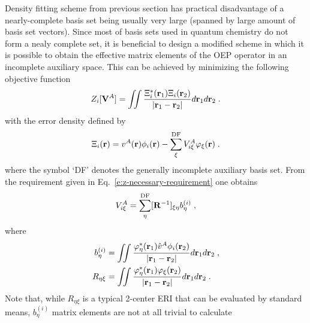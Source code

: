 \documentclass[aip,jcp,amsmath,amssymb,reprint,floatfix]{revtex4-1}
\begin{document}
Density fitting scheme from previous section has practical disadvantage of a nearly\hyp{}complete basis set
being usually very large (spanned by large amount of basis set vectors). 
Since most of basis sets used in quantum chemistry do not form a nealy complete
set, it is beneficial to design a modified scheme in which it is possible to obtain the effective 
matrix elements of the OEP operator in an incomplete auxiliary space. This can be achieved by minimizing 
the following objective function\cite{Cisneros.Andres.Piquemal.Darden.JCP.2005,Piquemal.Cisneros.Reinhardt.Gresh.Darden.JCP.2006}
%
\begin{equation} \label{e:z-incompl}
	Z_i[{\bf V}^A] = \iint 
        \frac{ \Xi_i^*({\bf r}_1) \Xi_i({\bf r}_2) }{\vert {\bf r}_1 - {\bf r}_2 \vert}  
         d{\bf r}_1 d{\bf r}_2  \;.
\end{equation}
%
with the error density defined by
%
\begin{equation} \label{e:error-incompl}
 \Xi_i({\bf r}) = v^A({\bf r}) \phi_i({\bf r}) - \sum_\xi^{\rm DF} V^A_{i\xi} \varphi_\xi({\bf r}) \;.
\end{equation}
%
where the symbol `DF' denotes the generally incomplete auxiliary basis set.
From the requirement given in Eq.~\eqref{e:z-necessary-requirement}
one obtains
%
\begin{equation} \label{e:v-incompl}
  V^A_{i\xi} = \sum_\eta^{\rm DF} [{\bf R}^{-1}]_{\xi\eta} b^{(i)}_\eta \;,
\end{equation}
%
where 
%
\begin{subequations}
\begin{align}
 b^{(i)}_\eta &= \iint 
                       \frac{ \varphi^*_\eta({\bf r}_1) \hat{v}^A \phi_i({\bf r}_2) } 
                            {\vert {\bf r}_1 - {\bf r}_2\vert}  
                 d{\bf r}_1 d{\bf r}_2 \;, \\
 R_{\eta\xi}  &= \iint 
                       \frac{ \varphi^*_\eta({\bf r}_1) \varphi_\xi({\bf r}_2) } 
                            {\vert {\bf r}_1 - {\bf r}_2\vert}  
                 d{\bf r}_1 d{\bf r}_2 \;.
\end{align}
\end{subequations}
%
Note that, while $R_{\eta\xi}$ is a typical 2\hyp{}center ERI 
that can be evaluated by standard means,\cite{McMurchie.Davidson.JComputPhys.1978}
$b^{(i)}_\eta$ matrix elements are not at all trivial to calculate
\end{document}
